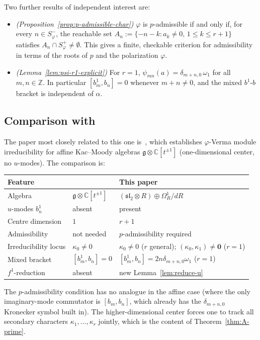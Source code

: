 \documentclass{amsart}
\newcommand{\Cx}{\mathbb{C}}
\newcommand{\Z}{\mathbb{Z}}
\newcommand{\g}{\mathfrak{g}}
\newcommand{\sltwo}{\mathfrak{sl}_2}
\theoremstyle{definition}
\theoremstyle{remark}
\numberwithin{equation}{section}
\begin{document}
Two further results of independent interest are:
\begin{itemize}[leftmargin=2em]
\item[\textbf{(C)}] \emph{(Proposition~\ref{prop:p-admissible-char})}
  $\varphi$ is $p$-admissible if and only if, for every
  $n\in S_\varphi^-$, the reachable set
  $A_n:=\{-n-k:a_k\neq0,\,1\le k\le r+1\}$
  satisfies $A_n\cap S_\varphi^+\neq\emptyset$.
  This gives a finite, checkable criterion for admissibility in terms
  of the roots of $p$ and the polarization $\varphi$.
\item[\textbf{(D)}] \emph{(Lemma~\ref{lem:psi-r1-explicit})}
  For $r=1$, $\psi_{mn}(a)=\delta_{m+n,0}\,\omega_1$ for all
  $m,n\in\Z$.  In particular $[b_m^1,b_n]=0$ whenever $m+n\neq0$,
  and the mixed $b^1$-$b$ bracket is independent of $\alpha$.
\end{itemize}
\subsection*{Comparison with \cite{Bekkert:2011aa}}
The paper most closely related to this one is~\cite{Bekkert:2011aa},
which establishes $\varphi$-Verma module irreducibility for affine
Kac--Moody algebras $\g\otimes\Cx[t^{\pm1}]$ (one-dimensional center,
no $u$-modes).  The comparison is:

\medskip
\begin{center}
\renewcommand{\arraystretch}{1.3}
\begin{tabular}{lll}
\hline
Feature & \cite{Bekkert:2011aa} & This paper \\
\hline
Algebra & $\g\otimes\Cx[t^{\pm1}]$ & $(\sltwo\otimes R)\oplus\Omega_R^1/dR$ \\
$u$-modes $b_n^1$ & absent & present \\
Centre dimension & $1$ & $r+1$ \\
Admissibility & not needed & $p$-admissibility required \\
Irreducibility locus & $\kappa_0\neq0$ & $\kappa_0\neq0$ ($r$ general);
  $(\kappa_0,\kappa_1)\neq\mathbf{0}$ ($r=1$) \\
Mixed bracket & $[b_m^1,b_n]=0$ & $[b_m^1,b_n]=2n\delta_{m+n,0}\omega_1$
  ($r=1$) \\
$f^1$-reduction & absent & new Lemma~\ref{lem:reduce-u} \\
\hline
\end{tabular}
\end{center}
\medskip

\noindent The $p$-admissibility condition has no analogue in the affine
case (where the only imaginary-mode commutator is $[b_m,b_n]$, which
already has the $\delta_{m+n,0}$ Kronecker symbol built in).
The higher-dimensional center forces one to track all secondary
characters $\kappa_1,\ldots,\kappa_r$ jointly, which is the content
of Theorem~\ref{thm:A-prime}.
\end{document}
